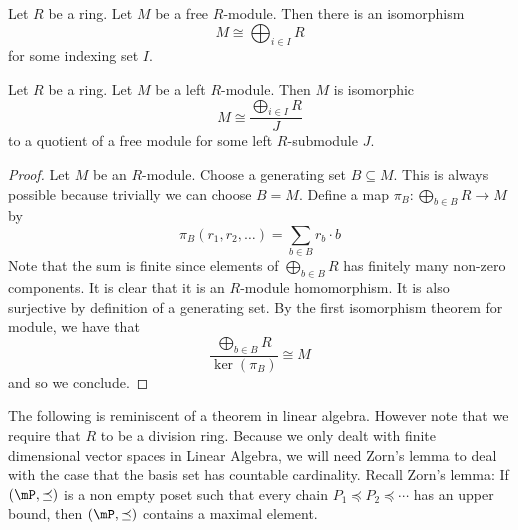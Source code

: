 \documentclass[a4paper]{article}
\begin{document}
\begin{prp}{}{} Let $R$ be a ring. Let $M$ be a free $R$-module. Then there is an isomorphism $$M\cong\bigoplus_{i\in I}R$$ for some indexing set $I$. 
\end{prp}

\begin{lmm}{}{} Let $R$ be a ring. Let $M$ be a left $R$-module. Then $M$ is isomorphic $$M\cong\frac{\bigoplus_{i\in I}R}{J}$$ to a quotient of a free module for some left $R$-submodule $J$. \tcbline
\begin{proof}
Let $M$ be an $R$-module. Choose a generating set $B\subseteq M$. This is always possible because trivially we can choose $B=M$. Define a map $\pi_B:\bigoplus_{b\in B}R\to M$ by $$\pi_B(r_1,r_2,\dots)=\sum_{b\in B}r_b\cdot b$$ Note that the sum is finite since elements of $\bigoplus_{b\in B}R$ has finitely many non-zero components. It is clear that it is an $R$-module homomorphism. It is also surjective by definition of a generating set. By the first isomorphism theorem for module, we have that $$\frac{\bigoplus_{b\in B}R}{\ker(\pi_B)}\cong M$$ and so we conclude. 
\end{proof}
\end{lmm}

The following is reminiscent of a theorem in linear algebra. However note that we require that $R$ to be a division ring. Because we only dealt with finite dimensional vector spaces in Linear Algebra, we will need Zorn's lemma to deal with the case that the basis set has countable cardinality. Recall Zorn's lemma: If $(\mP,\preceq)$ is a non empty poset such that every chain $P_1\preceq P_2\preceq\cdots$ has an upper bound, then $(\mP,\preceq)$ contains a maximal element. 
\end{document}
